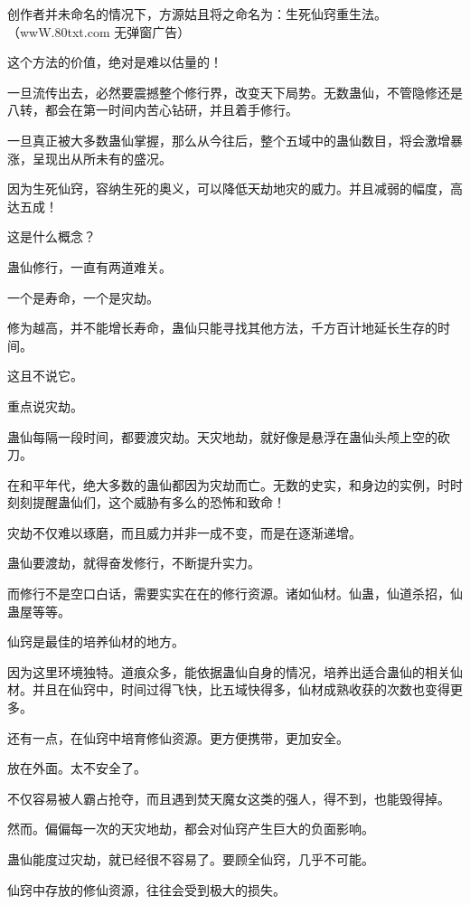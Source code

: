 
\begin{this_body}

创作者并未命名的情况下，方源姑且将之命名为：生死仙窍重生法。（wwW.80txt.com 无弹窗广告）

这个方法的价值，绝对是难以估量的！

一旦流传出去，必然要震撼整个修行界，改变天下局势。无数蛊仙，不管隐修还是八转，都会在第一时间内苦心钻研，并且着手修行。

一旦真正被大多数蛊仙掌握，那么从今往后，整个五域中的蛊仙数目，将会激增暴涨，呈现出从所未有的盛况。

因为生死仙窍，容纳生死的奥义，可以降低天劫地灾的威力。并且减弱的幅度，高达五成！

这是什么概念？

蛊仙修行，一直有两道难关。

一个是寿命，一个是灾劫。

修为越高，并不能增长寿命，蛊仙只能寻找其他方法，千方百计地延长生存的时间。

这且不说它。

重点说灾劫。

蛊仙每隔一段时间，都要渡灾劫。天灾地劫，就好像是悬浮在蛊仙头颅上空的砍刀。

在和平年代，绝大多数的蛊仙都因为灾劫而亡。无数的史实，和身边的实例，时时刻刻提醒蛊仙们，这个威胁有多么的恐怖和致命！

灾劫不仅难以琢磨，而且威力并非一成不变，而是在逐渐递增。

蛊仙要渡劫，就得奋发修行，不断提升实力。

而修行不是空口白话，需要实实在在的修行资源。诸如仙材。仙蛊，仙道杀招，仙蛊屋等等。

仙窍是最佳的培养仙材的地方。

因为这里环境独特。道痕众多，能依据蛊仙自身的情况，培养出适合蛊仙的相关仙材。并且在仙窍中，时间过得飞快，比五域快得多，仙材成熟收获的次数也变得更多。

还有一点，在仙窍中培育修仙资源。更方便携带，更加安全。

放在外面。太不安全了。

不仅容易被人霸占抢夺，而且遇到焚天魔女这类的强人，得不到，也能毁得掉。

然而。偏偏每一次的天灾地劫，都会对仙窍产生巨大的负面影响。

蛊仙能度过灾劫，就已经很不容易了。要顾全仙窍，几乎不可能。

仙窍中存放的修仙资源，往往会受到极大的损失。


\end{this_body}
